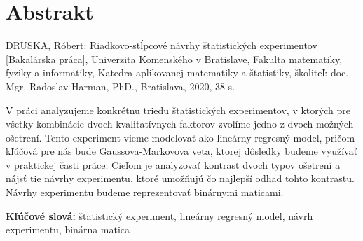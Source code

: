 \thispagestyle{empty}
\section*{Abstrakt}
DRUSKA, Róbert: Riadkovo-stĺpcové návrhy štatistických experimentov [Bakalárska práca],
Univerzita Komenského v Bratislave,
Fakulta matematiky, fyziky a informatiky,
Katedra aplikovanej matematiky a štatistiky,
školiteľ: doc. Mgr. Radoslav Harman, PhD.,
Bratislava, 2020, 38 s.

V práci analyzujeme konkrétnu triedu štatistických experimentov, v ktorých pre všetky kombinácie dvoch kvalitatívnych faktorov zvolíme jedno z dvoch možných ošetrení. 
Tento experiment vieme modelovať ako lineárny regresný model, pričom kľúčová pre nás bude Gaussova-Markovova veta, ktorej dôsledky budeme využívať v praktickej časti práce. 
Cieľom je analyzovať kontrast dvoch typov ošetrení a nájsť tie návrhy experimentu, ktoré umožňujú čo najlepší odhad tohto kontrastu.
Návrhy experimentu budeme reprezentovať binárnymi maticami.

\begin{flushleft}
  \textbf{Kľúčové slová:} štatistický experiment, lineárny regresný model, návrh experimentu, binárna matica
\end{flushleft}